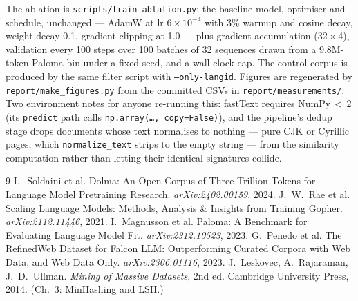 \documentclass{article}
\begin{document}
The ablation is \texttt{scripts/train\_ablation.py}: the baseline model, optimiser and
schedule, unchanged --- AdamW at lr $6\times10^{-4}$ with 3\% warmup and cosine decay, weight
decay 0.1, gradient clipping at 1.0 --- plus gradient accumulation (32\,$\times$\,4), validation
every 100 steps over 100 batches of 32 sequences drawn from a 9.8M-token Paloma bin under a
fixed seed, and a wall-clock cap. The control corpus is produced by the same filter script with
\texttt{--only-langid}. Figures are regenerated by \texttt{report/make\_figures.py} from the
committed CSVs in \texttt{report/measurements/}. Two environment notes for anyone
re-running this: fastText requires NumPy\,$<$\,2 (its \texttt{predict} path calls
\texttt{np.array(\dots, copy=False)}), and the pipeline's dedup stage drops documents whose
text normalises to nothing --- pure CJK or Cyrillic pages, which \texttt{normalize\_text}
strips to the empty string --- from the similarity computation rather than letting their
identical signatures collide.


\begin{thebibliography}{9}
 L.~Soldaini et al. Dolma: An Open Corpus of Three Trillion Tokens for
Language Model Pretraining Research. \emph{arXiv:2402.00159}, 2024.
 J.~W.~Rae et al. Scaling Language Models: Methods, Analysis \&
Insights from Training Gopher. \emph{arXiv:2112.11446}, 2021.
 I.~Magnusson et al. Paloma: A Benchmark for Evaluating Language Model
Fit. \emph{arXiv:2312.10523}, 2023.
 G.~Penedo et al. The RefinedWeb Dataset for Falcon LLM:
Outperforming Curated Corpora with Web Data, and Web Data Only. \emph{arXiv:2306.01116}, 2023.
 J.~Leskovec, A.~Rajaraman, J.~D.~Ullman. \emph{Mining of Massive
Datasets}, 2nd ed. Cambridge University Press, 2014. (Ch.~3: MinHashing and LSH.)
\end{thebibliography}
\end{document}
